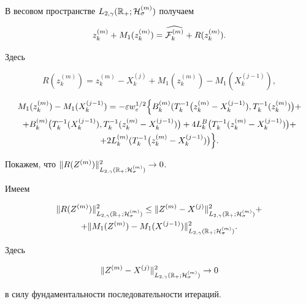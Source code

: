 В весовом пространстве $L_{2,\gamma}(\mathbb R_{+};{\cal H}^{(m)}_{\sigma})$ получаем  

$$

z^{(m)}_k+M_1(z^{(m)}_k)=\widehat{{\cal F}^{(m)}_k}+R(z^{(m)}_k).

$$

Здесь

$$

R(z^{(m)}_k)=z^{(m)}_k-X^{(j)}_k+M_1(z^{(m)}_k)-M_1(X^{(j-1)}_k),

$$

\begin{multline*}

M_1(z^{(m)}_k)-M_1(X^{(j-1)}_k)=-\varepsilon w_e^{1/2}

\Bigl\{ B^{(m)}_k(T^{-1}_k

\bigl(z^{(m)}_k-X^{(j-1)}_k),  T^{-1}_k(z^{(m)}_k)\bigr)+

\\

+B^{(m)}_k \bigl(T^{-1}_k(X^{(j-1)}_k),  T^{-1}_k(z^{(m)}_k-X^{(j-1)}_k)\bigr) +

4 L_k^B\bigl(T^{-1}_k(z^{(m)}_k-X^{(j-1)}_k)\bigr)+

\\

+2L^{(m)}_k(T^{-1}_k \bigl(z^{(m)}_k-X^{(j-1)}_k) \bigr)\Bigr\}.

\end{multline*}

Покажем, что $\|R(Z^{(m)})\|^2_{L_{2,\gamma}(\mathbb R_{+};{\cal H}^{(m)}_{\sigma})}\to 0$. 

Имеем 

\begin{multline*}

\|R(Z^{(m)})\|^2_{L_{2,\gamma}(\mathbb R_{+};{\cal H}^{(m)}_{\sigma})}\le 

\|Z^{(m)}-X^{(j)}\|^2_{L_{2,\gamma}(\mathbb R_{+};{\cal H}^{(m)}_{\sigma})}+\\

+

\|M_1(Z^{(m)})-M_1(X^{(j-1)})\|^2_{L_{2,\gamma}(\mathbb R_{+};{\cal H}^{(m)}_{\sigma})}.

\end{multline*}

Здесь

$$

\|Z^{(m)}-X^{(j)}\|^2_{L_{2,\gamma}(\mathbb R_{+};{\cal H}^{(m)}_{\sigma})}\to 0

$$

в силу фундаментальности последовательности итераций. 

